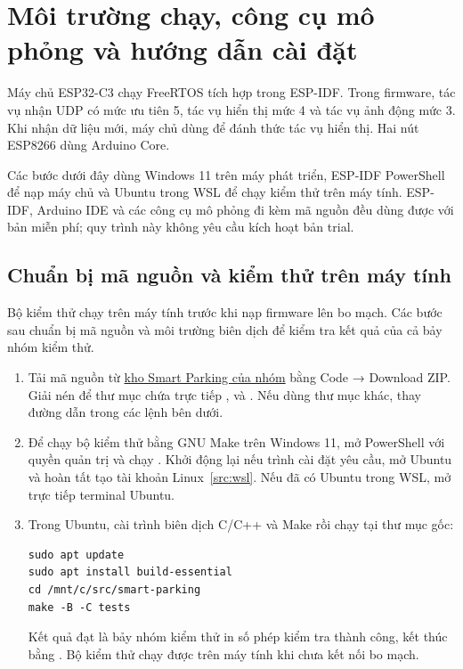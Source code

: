 \section{Môi trường chạy, công cụ mô phỏng và hướng dẫn cài đặt}\label{sec:huongdan}
Máy chủ ESP32-C3 chạy FreeRTOS tích hợp trong ESP-IDF. Trong firmware, tác vụ nhận UDP có mức ưu tiên 5, tác vụ hiển thị mức 4 và tác vụ ảnh động mức 3. Khi nhận dữ liệu mới, máy chủ dùng  để đánh thức tác vụ hiển thị. Hai nút ESP8266 dùng Arduino Core.

Các bước dưới đây dùng Windows 11 trên máy phát triển, ESP-IDF PowerShell để nạp máy chủ và Ubuntu trong WSL để chạy kiểm thử trên máy tính. ESP-IDF, Arduino IDE và các công cụ mô phỏng đi kèm mã nguồn đều dùng được với bản miễn phí; quy trình này không yêu cầu kích hoạt bản trial.

\subsection{Chuẩn bị mã nguồn và kiểm thử trên máy tính}
Bộ kiểm thử chạy trên máy tính trước khi nạp firmware lên bo mạch. Các bước sau chuẩn bị mã nguồn và môi trường biên dịch để kiểm tra kết quả của cả bảy nhóm kiểm thử.

\begin{enumerate}
\item Tải mã nguồn từ \href{https://github.com/thinhdinh25/INT3108_embedded-Smart-Parking-Project}{kho Smart Parking của nhóm} bằng Code → Download ZIP. Giải nén để thư mục  chứa trực tiếp ,  và . Nếu dùng thư mục khác, thay đường dẫn trong các lệnh bên dưới.
\item Để chạy bộ kiểm thử bằng GNU Make trên Windows 11, mở PowerShell với quyền quản trị và chạy . Khởi động lại nếu trình cài đặt yêu cầu, mở Ubuntu và hoàn tất tạo tài khoản Linux~\ref{src:wsl}. Nếu đã có Ubuntu trong WSL, mở trực tiếp terminal Ubuntu.
\item Trong Ubuntu, cài trình biên dịch C/C++ và Make rồi chạy tại thư mục gốc:
\begin{lstlisting}[style=shell]
sudo apt update
sudo apt install build-essential
cd /mnt/c/src/smart-parking
make -B -C tests
\end{lstlisting}
Kết quả đạt là bảy nhóm kiểm thử in số phép kiểm tra thành công, kết thúc bằng . Bộ kiểm thử chạy được trên máy tính khi chưa kết nối bo mạch.
\end{enumerate}

